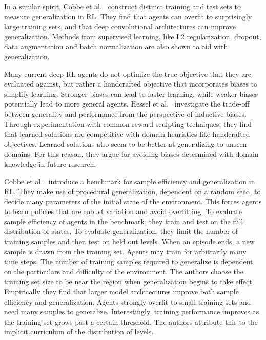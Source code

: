 In a similar spirit, Cobbe et al.~\cite{cobbe_generalization_2019} construct distinct training and test sets to measure generalization in RL.
They find that agents can overfit to surprisingly large training sets, and that deep convolutional architectures can improve generalization.
Methods from supervised learning, like L2 regularization, dropout, data augmentation and batch normalization are also shown to aid with generalization.

Many current deep RL agents do not optimize the true objective that they are evaluated against,
but rather a handcrafted objective that incorporates biases to simplify learning.
Stronger biases can lead to faster learning, while weaker biases potentially lead to more general agents.
Hessel et al.~\cite{hessel_inductive_2019} investigate the trade-off between generality and performance from the perspective of inductive biases.
Through experimentation with common reward sculpting techniques, they find that learned solutions are competitive with domain heuristics like handcrafted objectives.
Learned solutions also seem to be better at generalizing to unseen domains.
For this reason, they argue for avoiding biases determined with domain knowledge in future research.

Cobbe et al.~\cite{cobbe_procgen_2020} introduce a benchmark for sample efficiency and generalization in RL.
They make use of procedural generalization, dependent on a random seed, to decide many parameters of the initial state of the environment.
This forces agents to learn policies that are robust variation and avoid overfitting.
To evaluate sample efficiency of agents in the benchmark, they train and test on the full distribution of states.
To evaluate generalization, they limit the number of training samples and then test on held out levels.
When an episode ends, a new sample is drawn from the training set.
Agents may train for arbitrarily many time steps.
The number of training samples required to generalize is dependent on the particulars and difficulty of the environment.
The authors choose the training set size to be near the region when generalization begins to take effect.
Empirically they find that larger model architectures improve both sample efficiency and generalization.
Agents strongly overfit to small training sets and need many samples to generalize.
Interestingly, training performance improves as the training set grows past a certain threshold.
The authors attribute this to the implicit curriculum of the distribution of levels.

